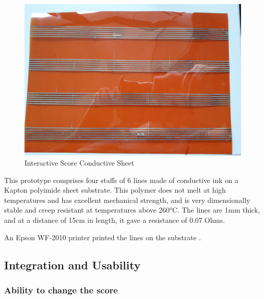 \begin{figure}[h]
    \centering
    \includegraphics{images/IS_conductive_sheet.jpeg}
    \caption{Interactive Score Conductive Sheet}
    \label{fig:IS_conductive_sheet}
\end{figure}

This prototype comprises four staffs of 6 lines made of conductive ink on a Kapton polyimide sheet substrate. This polymer does not melt at high temperatures and has excellent mechanical strength, and is very dimensionally stable and creep resistant at temperatures above 260°C. The lines are 1mm thick, and at a distance of 15cm in length, it gave a resistance of 0.07 Ohms.


An Epson WF-2010 printer printed the lines on the substrate \cite{adrien2022capacitive_to_notes}.


\subsection{Integration and Usability}

\subsubsection{Ability to change the score}

